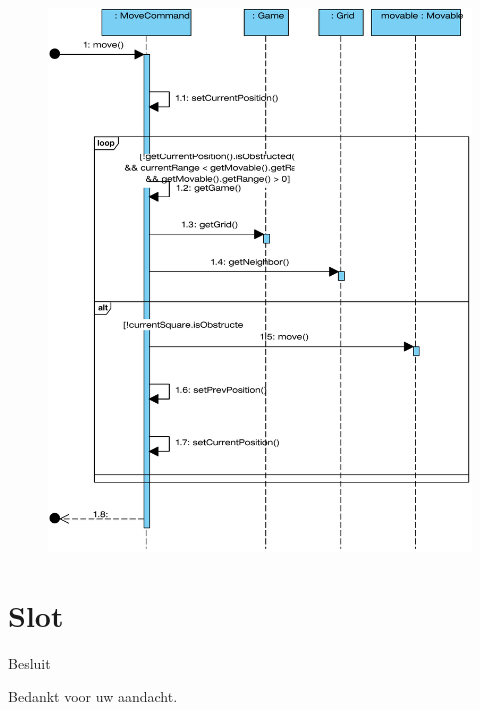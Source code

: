 \documentclass[t]{beamer}
\begin{document}
\begin{frame}
\begin{figure}
	\center
	\includegraphics[scale=0.25]{img/movecommand}
\end{figure}
\end{frame}


\section{Slot}
\begin{frame}{Besluit}
\vspace{0.8in}
\begin{center}
Bedankt voor uw aandacht.
\end{center}
\end{frame}
\end{document}
